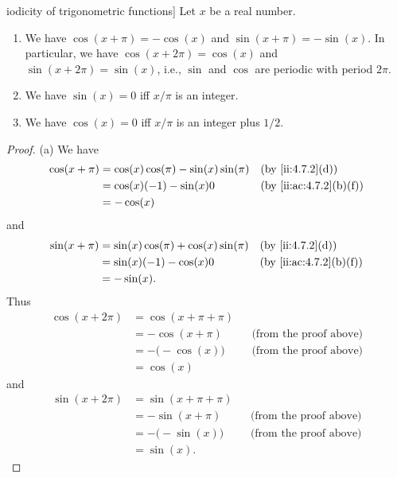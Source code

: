 \begin{thm}iodicity of trigonometric functions]\label{ii:4.7.5}
  Let \(x\) be a real number.
  \begin{enumerate}
    \item We have \(\cos(x + \pi) = -\cos(x)\) and \(\sin(x + \pi) = -\sin(x)\).
          In particular, we have \(\cos(x + 2\pi) = \cos(x)\) and \(\sin(x + 2\pi) = \sin(x)\), i.e., \(\sin\) and \(\cos\) are periodic with period \(2\pi\).
    \item We have \(\sin(x) = 0\) iff \(x / \pi\) is an integer.
    \item We have \(\cos(x) = 0\) iff \(x / \pi\) is an integer plus \(1 / 2\).
  \end{enumerate}
\end{thm}

\begin{proof}{(a)}
  We have
  \begin{align*}
    \cos(x + \pi) & = \cos(x) \cos(\pi) - \sin(x) \sin(\pi) &  & \by{ii:4.7.2}[d]      \\
                  & = \cos(x) (-1) - \sin(x) 0              &  & \by{ii:ac:4.7.2}[b,f] \\
                  & = -\cos(x)
  \end{align*}
  and
  \begin{align*}
    \sin(x + \pi) & = \sin(x) \cos(\pi) + \cos(x) \sin(\pi) &  & \by{ii:4.7.2}[d]      \\
                  & = \sin(x) (-1) - \cos(x) 0              &  & \by{ii:ac:4.7.2}[b,f] \\
                  & = -\sin(x).
  \end{align*}
  Thus
  \begin{align*}
    \cos(x + 2\pi) & = \cos(x + \pi + \pi)                                    \\
                   & = -\cos(x + \pi)      &  & \text{(from the proof above)} \\
                   & = -\big(-\cos(x)\big) &  & \text{(from the proof above)} \\
                   & = \cos(x)
  \end{align*}
  and
  \begin{align*}
    \sin(x + 2\pi) & = \sin(x + \pi + \pi)                                    \\
                   & = -\sin(x + \pi)      &  & \text{(from the proof above)} \\
                   & = -\big(-\sin(x)\big) &  & \text{(from the proof above)} \\
                   & = \sin(x).
  \end{align*}
\end{proof}

